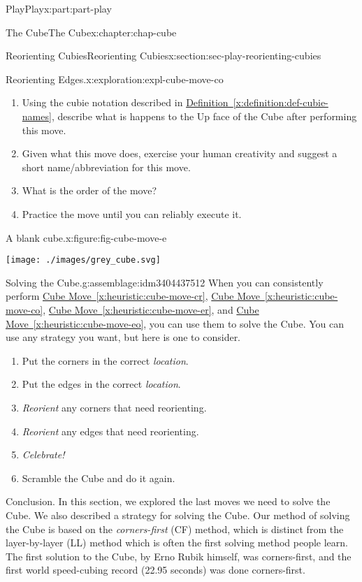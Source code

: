 \documentclass[oneside,10pt,]{book}
\newcommand{\xreffont}{\relax}
\numberwithin{equation}{section}
\begin{document}
\begin{partptx}{Play}{}{Play}{}{}{x:part:part-play}
\begin{chapterptx}{The Cube}{}{The Cube}{}{}{x:chapter:chap-cube}
\begin{sectionptx}{Reorienting Cubies}{}{Reorienting Cubies}{}{}{x:section:sec-play-reorienting-cubies}
\begin{exploration}{Reorienting Edges.}{x:exploration:expl-cube-move-co}
\begin{enumerate}
\item{}Using the cubie notation described in \hyperref[x:definition:def-cubie-names]{Definition~{\xreffont\ref{x:definition:def-cubie-names}}}, describe what is happens to the Up face of the Cube after performing this move.%
\item{}Given what this move does, exercise your human creativity and suggest a short name\slash{}abbreviation for this move.%
\item{}What is the order of the move?%
\item{}Practice the move until you can reliably execute it.%
\end{enumerate}
\begin{figureptx}{A blank cube.}{x:figure:fig-cube-move-e}{}%
\begin{image}{0.25}{0.5}{0.25}%
\texttt{[image: ./images/grey\_cube.svg]}
\end{image}%
\tcblower
\end{figureptx}%
\end{exploration}%
\begin{assemblage}{Solving the Cube.}{g:assemblage:idm3404437512}%
When you can consistently perform \hyperref[x:heuristic:cube-move-cr]{Cube Move~{\xreffont\ref{x:heuristic:cube-move-cr}}}, \hyperref[x:heuristic:cube-move-co]{Cube Move~{\xreffont\ref{x:heuristic:cube-move-co}}}, \hyperref[x:heuristic:cube-move-er]{Cube Move~{\xreffont\ref{x:heuristic:cube-move-er}}}, and \hyperref[x:heuristic:cube-move-eo]{Cube Move~{\xreffont\ref{x:heuristic:cube-move-eo}}}, you can use them to solve the Cube. You can use any strategy you want, but here is one to consider.%
\begin{enumerate}
\item{}Put the corners in the correct \emph{location}.%
\item{}Put the edges in the correct \emph{location}.%
\item{}\emph{Reorient} any corners that need reorienting.%
\item{}\emph{Reorient} any edges that need reorienting.%
\item{}\emph{Celebrate!}%
\item{}Scramble the Cube and do it again.%
\end{enumerate}
%
\end{assemblage}
\begin{conclusion}{Conclusion.}%
In this section, we explored the last moves we need to solve the Cube. We also described a strategy for solving the Cube. Our method of solving the Cube is based on the \emph{corners-first} (CF) method, which is distinct from the layer-by-layer (LL) method which is often the first solving method people learn. The first solution to the Cube, by Erno Rubik himself, was corners-first, and the first world speed-cubing record (22.95 seconds) was done corners-first.%

\end{conclusion}
\end{sectionptx}
\end{chapterptx}
\end{partptx}
\end{document}
